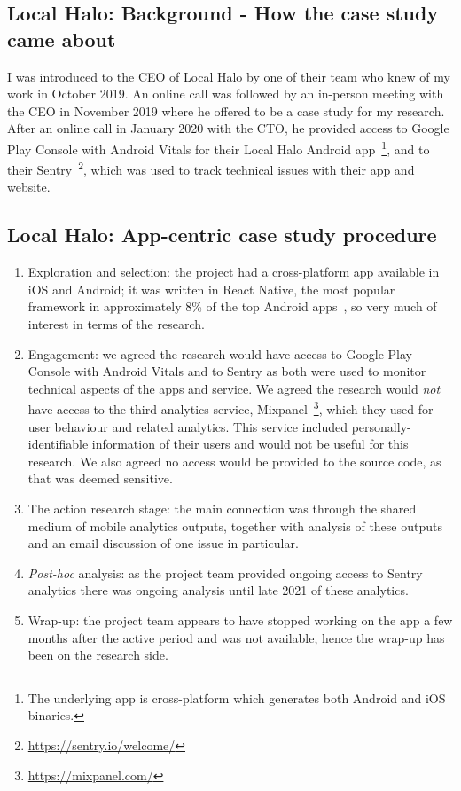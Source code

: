 \subsection{Local Halo: Background - How the case study came about}
I was introduced to the CEO of Local Halo by one of their team who knew of my work in October 2019. An online call was followed by an in-person meeting with the CEO in November 2019 where he offered to be a case study for my research. After an online call in January 2020 with the CTO, he provided access to Google Play Console with Android Vitals for their Local Halo Android app~\footnote{The underlying app is cross-platform which generates both Android and iOS binaries.}, and to their Sentry~\footnote{\url{https://sentry.io/welcome/}}, which was used to track technical issues with their app and website. 

\subsection{Local Halo: App-centric case study procedure}
{\small
\begin{enumerate}
    \itemsep0em
    \item Exploration and selection: the project had a cross-platform app available in iOS and Android; it was written in React Native, the  most popular framework in approximately 8\% of the top Android apps~\citep{appbrain2021_react_native_stats}, so very much of interest in terms of the research.
    \item Engagement: we agreed the research would have access to Google Play Console with Android Vitals and to Sentry as both were used to monitor technical aspects of the apps and service. We agreed the research would \textit{not} have access to the third analytics service, Mixpanel~\footnote{\url{https://mixpanel.com/}}, which they used for user behaviour and related analytics. This service included personally-identifiable information of their users and would not be useful for this research. We also agreed no access would be provided to the source code, as that was deemed sensitive. 
    \item The action research stage: the main connection was through the shared medium of mobile analytics outputs, together with analysis of these outputs and an email discussion of one issue in particular.
    \item \textit{Post-hoc} analysis: as the project team provided ongoing access to Sentry analytics there was ongoing analysis until late 2021 of these analytics. 
    \item Wrap-up: the project team appears to have stopped working on the app a few months after the active period and was not available, hence the wrap-up has been on the research side.
\end{enumerate}
}


